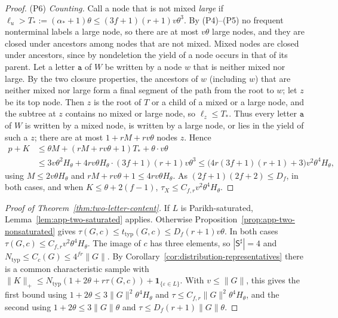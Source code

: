 \documentclass[11pt]{article}
\numberwithin{equation}{section}
\theoremstyle{plain}
\theoremstyle{definition}
\theoremstyle{remark}
\newcommand{\eps}{\varepsilon}
\theoremstyle{plain}
\begin{document}
\begin{proof}
(P6) \emph{Counting.}  Call a node that is not mixed \emph{large} if
$\ell_u>T_*:=(\alpha_*+1)\theta\le(3f+1)(r+1)v\theta^3$.  By (P4)--(P5) no frequent
nonterminal labels a large node, so there are at most $v\theta$ large nodes, and
they are closed under ancestors among nodes that are not mixed.  Mixed nodes are closed under ancestors, since by
nondeletion the yield of a node occurs in that of its parent.  Let a letter
$\mathtt a$ of $W$ be written by a node $w$ that is neither mixed nor large.  By the
two closure properties, the ancestors of $w$ (including $w$) that are neither
mixed nor large form a final segment of the path from the root to $w$; let $z$ be
its top node.  Then $z$ is the root of $T$ or a child of a mixed or a large node,
and the subtree at $z$ contains no mixed or large node, so $\ell_z\le T_*$.  Thus
every letter $\mathtt a$ of $W$ is written by a mixed node, is written by a large
node, or lies in the yield of such a $z$; there are at most $1+rM+rv\theta$ nodes
$z$.  Hence
\[
\begin{aligned}
 p+K&\le\theta M+(rM+rv\theta+1)T_*+\theta\cdot v\theta\\
 &\le3v\theta^2H_\theta+4rv\theta H_\theta\cdot(3f+1)(r+1)v\theta^3
 \le\bigl(4r(3f+1)(r+1)+3\bigr)v^2\theta^4H_\theta,
\end{aligned}
\]
using $M\le2v\theta H_\theta$ and $rM+rv\theta+1\le4rv\theta H_\theta$.  As
$(2f+1)(2f+2)\le D_f$, in both cases, and when
$K\le\theta+2(f-1)$, $\tau_X\le C_{f,r}v^2\theta^4H_\theta$.
\end{proof}

\begin{proof}[Proof of Theorem~\ref{thm:two-letter-content}]
If $L$ is Parikh-saturated, Lemma~\ref{lem:app-two-saturated} applies.  Otherwise
Proposition~\ref{prop:app-two-nonsaturated} gives
$\tau(G,c)\le t_{\mathrm{typ}}(G,c)\le D_f(r+1)v\theta$.  In both cases
$\tau(G,c)\le C_{f,r}v^2\theta^4H_\theta$.  The image of $c$ has three elements, so
$|\mathsf S^\sharp|=4$ and $N_{\mathrm{typ}}\le C_c(G)\le4^{fr}\|G\|$.  By
Corollary~\ref{cor:distribution-representatives} there is a common characteristic
sample with
$\|K\|_+\le N_{\mathrm{typ}}(1+2\theta+r\tau(G,c))+\mathbf 1_{\{\eps\in L\}}$.  With
$v\le\|G\|$, this gives the first bound using $1+2\theta\le3\|G\|^2\theta^4H_\theta$ and
$\tau\le C_{f,r}\|G\|^2\theta^4H_\theta$, and the second using $1+2\theta\le3\|G\|\theta$ and
$\tau\le D_f(r+1)\|G\|\theta$.
\end{proof}
\end{document}

